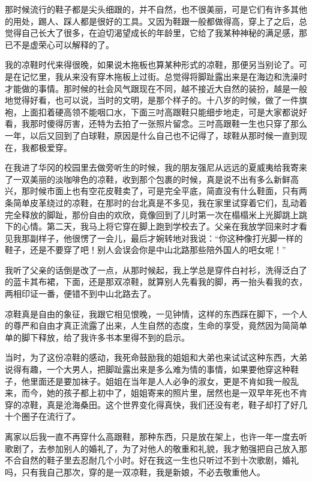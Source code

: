 \par 那时候流行的鞋子都是尖头细跟的，并不自然，也不很美丽，可是它们有许多其他的用处，踢人、踩人都是很好的工具。又因为鞋跟一般都做得高，穿上了之后，总觉得自己长大了很多，在迫切渴望成长的年龄里，它给了我某种神秘的满足感，那已不是虚荣心可以解释的了。
\par 我的凉鞋时代来得很晚，如果说木拖板也算某种形式的凉鞋，那便另当别论了。可是在记忆里，我从来没有穿木拖板上过街。总觉得将脚趾露出来是在海边和洗澡时才能做的事情。那时候的社会风气跟现在不同，越不接近大自然的装扮，越是一般地觉得好看，也可以说，当时的文明，是那个样子的。十八岁的时候，做了一件旗袍，上面扣着硬高领不能咽口水，下面三吋高跟鞋只能细步地走，可是大家都说好看，我那时傻得厉害，还特为去拍了一张照片留念。三吋高跟鞋一生也只穿了那么一年，以后又回到了白球鞋，原因是什么自己也不记得了，球鞋从那时候一直到现在，我都极爱穿。
\par 在我进了华冈的校园里去做旁听生的时候，我的朋友强尼从远远的夏威夷给我寄来了一双美丽的淡咖啡色的凉鞋，收到那个包裹的时候，真是说不出有多么新鲜高兴，那时候市面上也有空花皮鞋卖了，可是完全平底，简直没有什么鞋面，只有两条简单皮革绕过的凉鞋，在那时的台北真是不多见，我在家里试穿着它们，乱动着完全释放的脚趾，那份自由的欢欣，竟像回到了儿时第一次在榻榻米上光脚跳上跳下的心情。第二天，我马上将它穿在脚上跑到学校去了。父亲在我放学回来时才看见我那副样子，他很愣了一会儿，最后才婉转地对我说：“你这种像打光脚一样的鞋子，还是不要穿了吧！别人会误会你是中山北路那些陪外国人的吧女呢！”
\par 我听了父亲的话倒是改了一点，从那时候起，我上学总是穿件白衬衫，洗得泛白了的蓝卡其布裙，下面，还是那双凉鞋，就算别人先看我的脚，再一抬头看我的衣，两相印证一番，便错不到中山北路去了。
\par 凉鞋真是自由的象征，我跟它相见恨晚，一见钟情，这样的东西踩在脚下，一个人的尊严和自由才真正流露了出来，人生自然的态度，生命的享受，竟然因为简简单单的脚下释放，给了我许多书本里得不到的启示。
\par 当时，为了这份凉鞋的感动，我死命鼓励我的姐姐和大弟也来试试这种东西，大弟说得有趣，一个大男人，把脚趾露出来是多么难为情的事情，如果要他穿这种鞋子，他里面还是要加袜子。姐姐在当年是人人必争的淑女，更是不肯如我一般乱来，而今，她的孩子都上初中了，姐姐寄来的照片里，居然也是一双早年死也不肯穿的凉鞋，真是沧海桑田。这个世界变化得真快，我们还没有老，鞋子却打了好几十个圈子在流行了。
\par 离家以后我一直不再穿什么高跟鞋，那种东西，只是放在架上，也许一年一度去听歌剧了，去参加别人的婚礼了，为了对他人的敬重和礼貌，我才勉强把自己放入那不合自然的鞋子里去忍耐几个小时。好在我这一生也只听过不到十次歌剧，婚礼吗，只有我自己那次，穿的是一双凉鞋，我是新娘，不必去敬重他人。
